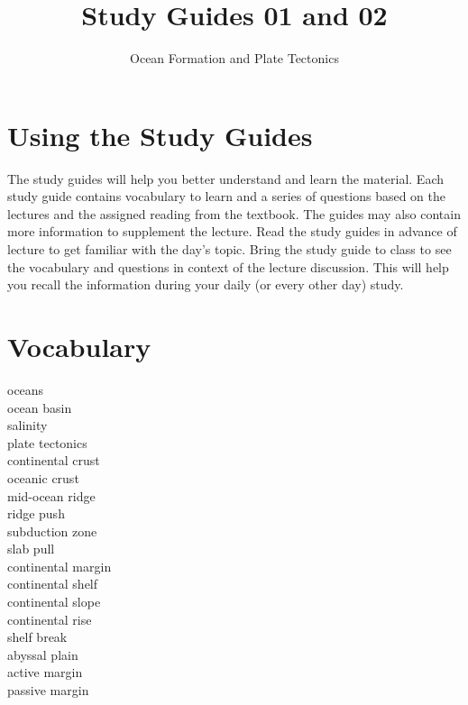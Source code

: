 \documentclass[letterpaper]{tufte-handout}
\title{Study Guides 01 and 02\hfill}
\author{Ocean Formation and Plate Tectonics}
\date{} %
\begin{document}
\maketitle	%


\section{Using the Study Guides}
The study guides will help you better understand and learn the material.  Each study guide contains vocabulary to learn and a series of questions based on the lectures and the assigned reading from the textbook.  The guides may also contain more information to supplement the lecture.  Read the study guides in advance of lecture to get familiar with the day's topic. Bring the study guide to class to see the vocabulary and questions in context of the lecture discussion.  This will help you recall the information during your daily (or every other day) study.

\section{Vocabulary}
\vspace{-1\baselineskip}
\begin{multicols}{2}
oceans\\
ocean basin\\
salinity \\
plate tectonics\\
continental crust\\
oceanic crust\\
mid-ocean ridge\\
ridge push\\
subduction zone\\
slab pull\\
continental margin\\
continental shelf\\
continental slope\\
continental rise\\
shelf break\\
abyssal plain\\
active margin\\
passive margin
\end{multicols}
\end{document}
